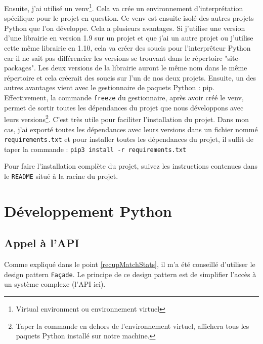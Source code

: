 \documentclass[a4paper,14pt]{extarticle}
\begin{document}
{Ensuite, j'ai utilisé un venv\footnote{Virtual environment ou environnement virtuel}. Cela va crée un environnement d'interprétation spécifique pour le projet en question. Ce venv est ensuite isolé des autres projets Python que l'on développe. 
Cela a plusieurs avantages. Si j'utilise une version d'une librairie en version 1.9 sur un projet et que j'ai un autre projet ou j'utilise cette même librairie en 1.10, cela va créer des soucis pour l'interprêteur Python car il ne sait pas différencier les versions se trouvant dans le répertoire "site-packages". Les deux versions de la librairie auront le même nom dans le même répertoire et cela créerait des soucis sur l'un de nos deux projets.
Ensuite, un des autres avantages vient avec le gestionnaire de paquets Python : pip. Effectivement, la commande \texttt{freeze} du gestionnaire, après avoir créé le venv, permet de sortir toutes les dépendances du projet que nous développons avec leurs versions\footnote{Taper la commande en dehors de l'environnement virtuel, affichera tous les paquets Python installé sur notre machine.}. C'est très utile pour faciliter l'installation du projet.
Dans mon cas, j'ai exporté toutes les dépendances avec leurs versions dans un fichier nommé \texttt{requirements.txt} et pour installer toutes les dépendances du projet, il suffit de taper la commande :
\noindent\texttt{pip3 install -r requirements.txt}

Pour faire l'installation complète du projet, suivez les instructions contenues dans le \texttt{README} situé à la racine du projet.

\newpage

\section{Développement Python}

\subsection{Appel à l'API}

Comme expliqué dans le point \ref{recupMatchStats}, il m'a été conseillé d'utiliser le design pattern \texttt{Façade}. Le principe de ce design pattern est de simplifier l'accès à un système complexe (l'API ici).


}
\end{document}
